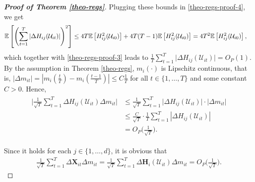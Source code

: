 \documentclass[a4paper,12pt]{article}
\begin{document}
\begin{proof}[\textnormal{\textbf{Proof of Theorem \ref{theo-regs}}}]
Plugging these bounds in \eqref{theo-regs-proof-4}, we get
\begin{align*}
\mathbb{E} &\left[ \left(\sum_{t=1}^T \left|\Delta  H_{ij} (\mathcal{U}_{it})\right|\right)^2 \right] \leq 4T \mathbb{E} \left[ H^2_{ij} (\mathcal{U}_{i0}) \right] + 4T(T-1)\mathbb{E} \left[ H^2_{ij} (\mathcal{U}_{i0}) \right] = 4 T^2 \mathbb{E} \left[ H^2_{ij} (\mathcal{U}_{i0}) \right],
\end{align*}
which together with \eqref{theo-regs-proof-3} leads to $\frac{1}{T}\sum_{t=1}^T \big|\Delta H_{ij}(\mathcal{U}_{it})\big| = O_P(1)$. By the assumption in Theorem \ref{theo-regs}, $m_i(\cdot)$ is Lipschitz continuous, that is,  $|\Delta m_{it}| = \left|m_i \left( \frac{t}{T} \right) - m_i \left(\frac{t-1}{T}\right) \right| \leq C \frac{1}{T}$ for all $t \in \{1, \ldots, T\}$ and some constant $C > 0$. Hence, 
\begin{align}\label{theo-regs-proof-2}
\begin{split}
\Big| \frac{1}{\sqrt{T}}\sum_{t=1}^T \Delta  H_{ij} (\mathcal{U}_{it})\Delta m_{it}\Big| &\leq \frac{1}{\sqrt{T}}\sum_{t=1}^T \big|\Delta  H_{ij} (\mathcal{U}_{it})\big| \cdot \big| \Delta m_{it} \big| \\
	& \leq \frac{C}{\sqrt{T}} \cdot \frac{1}{T} \sum_{t=1}^T \left|\Delta  H_{ij} (\mathcal{U}_{it})\right|\\
& = O_P\Big(\frac{1}{\sqrt{T}}\Big).
\end{split}
\end{align}

Since it holds for each $j\in\{1, \ldots, d\}$, it is obvious that
\begin{align}\label{theo-regs-proof-6}
\frac{1}{\sqrt{T}}\sum_{t=1}^T \Delta \mathbf{X}_{it} \Delta m_{it}  =\frac{1}{\sqrt{T}}\sum_{t=1}^T \Delta  \mathbf{H}_i (\mathcal{U}_{it})\Delta m_{it}= O_P\Big(\frac{1}{\sqrt{T}}\Big).
\end{align}


\end{proof}
\end{document}
